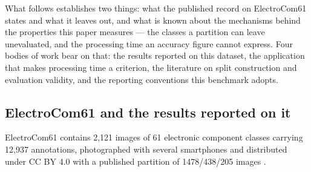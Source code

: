 %
%

What follows establishes two things: what the published record on ElectroCom61
states and what it leaves out, and what is known about the mechanisms behind the
properties this paper measures --- the classes a partition can leave unevaluated,
and the processing time an accuracy figure cannot express. Four bodies of work
bear on that: the results reported on this dataset, the application that makes
processing time a criterion, the literature on split construction and evaluation
validity, and the reporting conventions this benchmark adopts.

\subsection{ElectroCom61 and the results reported on it}
\label{sec:related-electrocom61}

ElectroCom61 contains 2{,}121 images of 61 electronic component classes carrying
12{,}937 annotations, photographed with several smartphones and distributed
under CC BY 4.0 with a published partition of 1478/438/205 images
\citep{electrocom61}.

